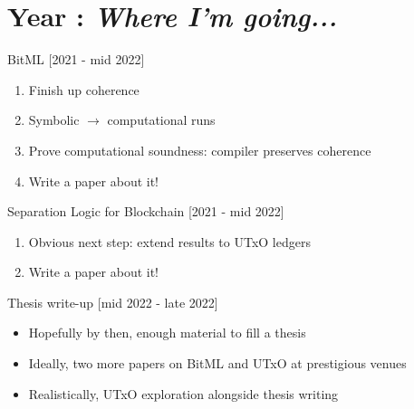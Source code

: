 \documentclass[aspectratio=43]{beamer}
\renewcommand\alert[1]{\textcolor{mLightBrown}{#1}}
\newcommand\III{\textgoth{III}\xspace}
\begin{document}
\section{Year \III: \textit{Where I'm going...}}

\begin{frame}{BitML [2021 - mid 2022]}
\begin{enumerate}
\item Finish up coherence
\item Symbolic $\rightarrow$ computational runs
\item Prove \alert{computational soundness}: compiler preserves coherence
\item Write a paper about it!
\end{enumerate}
\begin{center}
\vfill
{}
\end{center}
\end{frame}

\begin{frame}{Separation Logic for Blockchain [2021 - mid 2022]}
\begin{enumerate}
\item Obvious next step: extend results to UTxO ledgers
\item Write a paper about it!
\end{enumerate}
\begin{center}
\vfill
\scalebox{.8}{
  \begin{tikzpicture}
  \hoareSemantics
  \end{tikzpicture}
}
\end{center}
\end{frame}

\begin{frame}{Thesis write-up [mid 2022 - late 2022]}
\begin{itemize}
\item Hopefully by then, enough material to fill a thesis
\item Ideally, two more papers on BitML and UTxO at prestigious venues
\item Realistically, UTxO exploration alongside thesis writing
\end{itemize}
\end{frame}
\end{document}
